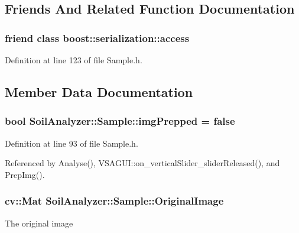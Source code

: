 \subsection{Friends And Related Function Documentation}
\hypertarget{class_soil_analyzer_1_1_sample_ac98d07dd8f7b70e16ccb9a01abf56b9c}{}
\subsubsection[{boost\+::serialization\+::access}]{\setlength{\rightskip}{0pt plus 5cm}friend class boost\+::serialization\+::access\hspace{0.3cm}{\ttfamily [friend]}}\label{class_soil_analyzer_1_1_sample_ac98d07dd8f7b70e16ccb9a01abf56b9c}


Definition at line 123 of file Sample.\+h.



\subsection{Member Data Documentation}
\hypertarget{class_soil_analyzer_1_1_sample_ab025a26f7276128a5a974cae15b51dfc}{}
\subsubsection[{img\+Prepped}]{\setlength{\rightskip}{0pt plus 5cm}bool Soil\+Analyzer\+::\+Sample\+::img\+Prepped = false}\label{class_soil_analyzer_1_1_sample_ab025a26f7276128a5a974cae15b51dfc}


Definition at line 93 of file Sample.\+h.



Referenced by Analyse(), V\+S\+A\+G\+U\+I\+::on\+\_\+vertical\+Slider\+\_\+slider\+Released(), and Prep\+Img().

\hypertarget{class_soil_analyzer_1_1_sample_a0d6e6fca9e232a77329daf0b4b29c634}{}
\subsubsection[{Original\+Image}]{\setlength{\rightskip}{0pt plus 5cm}cv\+::\+Mat Soil\+Analyzer\+::\+Sample\+::\+Original\+Image}\label{class_soil_analyzer_1_1_sample_a0d6e6fca9e232a77329daf0b4b29c634}
The original image 

